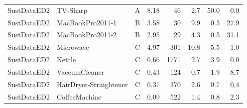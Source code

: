 \begin{table}[H]
\begin{tabular}{@{}llcrrrrr@{}}
SustDataED2 & TV-Sharp & A & 8.18 & 46 & 2.7 & 50.0 & 0.0 \\
SustDataED2 & MacBookPro2011-1 & B & 3.58 & 30 & 9.9 & 0.5 & 27.9 \\
SustDataED2 & MacBookPro2011-2 & B & 2.95 & 29 & 4.3 & 0.5 & 31.1 \\
SustDataED2 & Microwave & C & 4.97 & 301 & 10.8 & 5.5 & 1.0 \\
SustDataED2 & Kettle & C & 0.66 & 1771 & 2.7 & 3.9 & 0.0 \\
SustDataED2 & VaccumCleaner & C & 0.43 & 124 & 0.7 & 1.9 & 8.7 \\
SustDataED2 & HairDryer-Straightener & C & 0.31 & 370 & 2.6 & 0.7 & 0.4 \\
SustDataED2 & CoffeeMachine & C & 0.09 & 522 & 1.4 & 0.8 & 2.3 \\
\bottomrule
\end{tabular}
\end{table}

